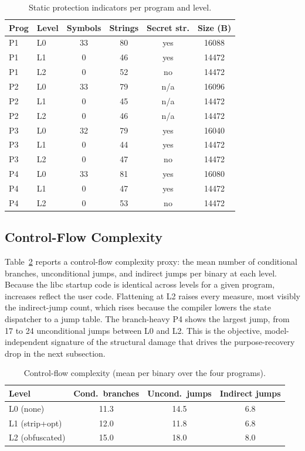 \documentclass[conference]{IEEEtran}
\begin{document}
\begin{table}[t]
\caption{Static protection indicators per program and level.}
\label{tab:static}
\centering
\footnotesize
\begin{tabular}{@{}llcccc@{}}
\toprule
\textbf{Prog} & \textbf{Level} & \textbf{Symbols} & \textbf{Strings} & \textbf{Secret str.} & \textbf{Size (B)} \\
\midrule
P1 & L0 & 33 & 80 & yes & 16088 \\
P1 & L1 & 0  & 46 & yes & 14472 \\
P1 & L2 & 0  & 52 & no  & 14472 \\
P2 & L0 & 33 & 79 & n/a & 16096 \\
P2 & L1 & 0  & 45 & n/a & 14472 \\
P2 & L2 & 0  & 46 & n/a & 14472 \\
P3 & L0 & 32 & 79 & yes & 16040 \\
P3 & L1 & 0  & 44 & yes & 14472 \\
P3 & L2 & 0  & 47 & no  & 14472 \\
P4 & L0 & 33 & 81 & yes & 16080 \\
P4 & L1 & 0  & 47 & yes & 14472 \\
P4 & L2 & 0  & 53 & no  & 14472 \\
\bottomrule
\end{tabular}
\end{table}

\subsection{Control-Flow Complexity}
Table~\ref{tab:cfg} reports a control-flow complexity proxy: the mean number of
conditional branches, unconditional jumps, and indirect jumps per binary at each
level. Because the libc startup code is identical across levels for a given
program, increases reflect the user code. Flattening at L2 raises every measure,
most visibly the indirect-jump count, which rises because the compiler lowers the
state dispatcher to a jump table. The branch-heavy P4 shows the largest jump,
from 17 to 24 unconditional jumps between L0 and L2. This is the objective,
model-independent signature of the structural damage that drives the purpose-recovery
drop in the next subsection.

\begin{table}[t]
\caption{Control-flow complexity (mean per binary over the four programs).}
\label{tab:cfg}
\centering
\footnotesize
\begin{tabular}{@{}lccc@{}}
\toprule
\textbf{Level} & \textbf{Cond.\ branches} & \textbf{Uncond.\ jumps} & \textbf{Indirect jumps} \\
\midrule
L0 (none)       & 11.3 & 14.5 & 6.8 \\
L1 (strip+opt)  & 12.0 & 11.8 & 6.8 \\
L2 (obfuscated) & 15.0 & 18.0 & 8.0 \\
\bottomrule
\end{tabular}
\end{table}
\end{document}
